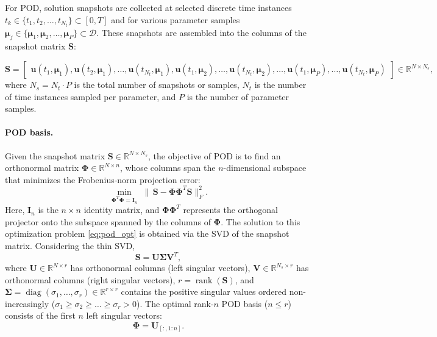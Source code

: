 For POD, solution snapshots are collected at selected discrete time instances $t_k \in \{t_1, t_2, \dots, t_{N_t}\} \subset [0, T]$ and for various parameter samples $\boldsymbol{\mu}_j \in \{\boldsymbol{\mu}_1, \boldsymbol{\mu}_2, \dots, \boldsymbol{\mu}_P\} \subset \mathcal{D}$. These snapshots are assembled into the columns of the snapshot matrix $\mathbf{S}$:

\begin{equation}
\label{eq:snapshot_matrix}
\mathbf{S} = 
\begin{bmatrix}
\mathbf{u}(t_1, \boldsymbol{\mu}_1), \mathbf{u}(t_2, \boldsymbol{\mu}_1), \dots, \mathbf{u}(t_{N_t}, \boldsymbol{\mu}_1), \mathbf{u}(t_1, \boldsymbol{\mu}_2), \dots, \mathbf{u}(t_{N_t}, \boldsymbol{\mu}_2), \dots, \mathbf{u}(t_1, \boldsymbol{\mu}_P), \dots, \mathbf{u}(t_{N_t}, \boldsymbol{\mu}_P)
\end{bmatrix}
\in \mathbb{R}^{N \times N_s},
\end{equation}
where $N_s = N_t \cdot P$ is the total number of snapshots or samples, $N_t$ is the number of time instances sampled per parameter, and $P$ is the number of parameter samples.

\paragraph{POD basis.}
Given the snapshot matrix $\mathbf{S} \in \mathbb{R}^{N \times N_s}$, the objective of POD is to find an orthonormal matrix $\boldsymbol{\Phi} \in \mathbb{R}^{N \times n}$, whose columns span the $n$-dimensional subspace that minimizes the Frobenius‐norm projection error:
\begin{equation}
\label{eq:pod_opt}
\min_{\boldsymbol{\Phi}^{\!T}\boldsymbol{\Phi}=\mathbf{I}_n}
\;\bigl\|\,\mathbf{S} - \boldsymbol{\Phi}\boldsymbol{\Phi}^{\!T}\mathbf{S}\bigr\|_{F}^{2}.
\end{equation}
Here, $\mathbf{I}_n$ is the $n \times n$ identity matrix, and $\boldsymbol{\Phi}\boldsymbol{\Phi}^{\!T}$ represents the orthogonal projector onto the subspace spanned by the columns of $\boldsymbol{\Phi}$. The solution to this optimization problem \eqref{eq:pod_opt} is obtained via the SVD of the snapshot matrix. Considering the thin SVD,
\begin{equation}
\mathbf{S}= \mathbf{U}\boldsymbol{\Sigma}\mathbf{V}^{\!T},
\end{equation}
where $\mathbf{U} \in \mathbb{R}^{N \times r}$ has orthonormal columns (left singular vectors), $\mathbf{V} \in \mathbb{R}^{N_s \times r}$ has orthonormal columns (right singular vectors), $r = \operatorname{rank}(\mathbf{S})$, and $\boldsymbol{\Sigma}=\operatorname{diag}(\sigma_1,\dots,\sigma_r) \in \mathbb{R}^{r \times r}$ contains the positive singular values ordered non-increasingly ($\sigma_1 \ge \sigma_2 \ge \dots \ge \sigma_r > 0$). The optimal rank-$n$ POD basis ($n \le r$) consists of the first $n$ left singular vectors:
\begin{equation}
\boldsymbol{\Phi}= \mathbf{U}_{[:,1:n]}.
\end{equation}

